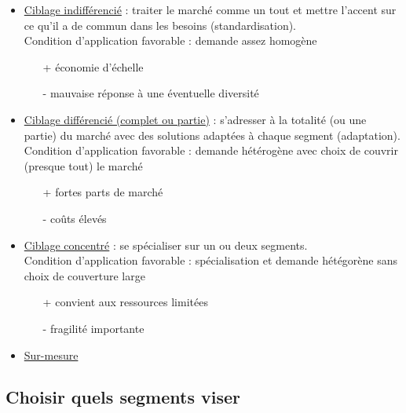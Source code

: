 			
			\begin{itemize}
				\item \underline{Ciblage indifférencié} : traiter le marché comme un tout et mettre l'accent sur ce qu'il  a de commun dans les besoins (standardisation). \\
				
				Condition d'application favorable : demande assez homogène 
				
				\begin{itemize}
					\item[+] économie d'échelle
					\item[-] mauvaise réponse à une éventuelle diversité
				\end{itemize}
				
				
				\item \underline{Ciblage différencié (complet ou partie)} : s'adresser à la totalité (ou une partie) du marché avec des solutions adaptées à chaque segment (adaptation).   \\
				
				Condition d'application favorable : demande hétérogène avec choix de couvrir (presque tout) le marché
				
				\begin{itemize}
					\item[+] fortes parts de marché
					\item[-] coûts élevés
				\end{itemize}
				
				
				\item \underline{Ciblage concentré} : se spécialiser sur un ou deux segments. \\
				
				Condition d'application favorable : spécialisation et demande hétégorène sans choix de couverture large
				
				\begin{itemize}
					\item[+] convient aux ressources limitées
					\item[-] fragilité importante
				\end{itemize}
				
				
				
				\item \underline{Sur-mesure}
			\end{itemize}

			
			
			
		\subsection{Choisir quels segments viser}
		
